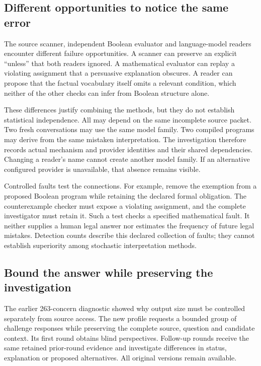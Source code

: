 \subsection{Different opportunities to notice the same error}

The source scanner, independent Boolean evaluator and language-model readers
encounter different failure opportunities. A scanner can preserve an explicit
``unless'' that both readers ignored. A mathematical evaluator can replay a
violating assignment that a persuasive explanation obscures. A reader can
propose that the factual vocabulary itself omits a relevant condition, which
neither of the other checks can infer from Boolean structure alone.

These differences justify combining the methods, but they do not establish
statistical independence. All may depend on the same incomplete source packet.
Two fresh conversations may use the same model family. Two compiled programs
may derive from the same mistaken interpretation. The investigation therefore
records actual mechanism and provider identities and their shared dependencies.
Changing a reader's name cannot create another model family. If an alternative
configured provider is unavailable, that absence remains visible.

Controlled faults test the connections. For example, remove the exemption from
a proposed Boolean program while retaining the declared formal obligation.
The counterexample checker must expose a violating assignment, and the complete
investigator must retain it. Such a test checks a specified mathematical fault.
It neither supplies a human legal answer nor estimates the frequency of future
legal mistakes. Detection counts describe this declared collection of faults;
they cannot establish superiority among stochastic interpretation methods.

\subsection{Bound the answer while preserving the investigation}

The earlier 263-concern diagnostic showed why output size must be controlled
separately from source access. The new profile requests a bounded group of
challenge responses while preserving the complete source, question and candidate
context. Its first round obtains blind perspectives. Follow-up rounds receive
the same retained prior-round evidence and investigate differences in status,
explanation or proposed alternatives. All original versions remain available.

